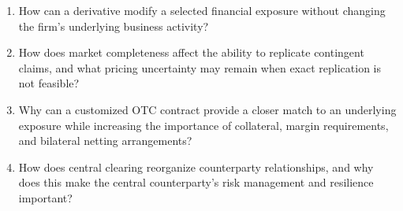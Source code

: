 \begin{enumerate}

\item How can a derivative modify a selected financial
exposure without changing the firm's underlying
business activity?

\item How does market completeness affect the ability
to replicate contingent claims, and what pricing
uncertainty may remain when exact replication is
not feasible?

\item Why can a customized OTC contract provide a
closer match to an underlying exposure while
increasing the importance of collateral, margin
requirements, and bilateral netting arrangements?

\item How does central clearing reorganize counterparty
relationships, and why does this make the central
counterparty's risk management and resilience
important?

\end{enumerate}



